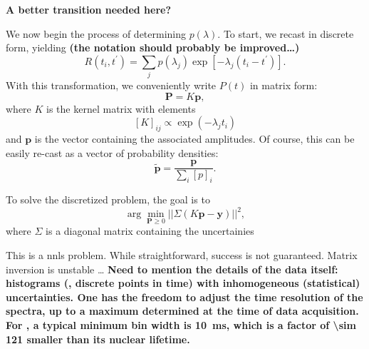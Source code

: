 \textbf{A better transition needed here?}


We now begin the process of determining $p ( \lambda )$.
To start, we recast  in discrete form, yielding
\textbf{(the notation should probably be improved\dots)}
\begin{equation} \label{eq:slr-sum}
   R \left (t_{i}, t^{\prime} \right ) = \sum_{j} p ( \lambda_{j} ) \exp \left [- \lambda_{j} \left ( t_{i} - t^{\prime} \right ) \right ] .
\end{equation}
With this transformation, we conveniently write $P(t)$ in matrix form:
\begin{equation} \label{eq:signal-matrix}
   \mathbf{P} = K \mathbf{p},
\end{equation}
where $K$ is the kernel matrix with elements
\begin{equation}
   \label{eq:kernel}
   [K]_{ij} \propto \exp \left ( - \lambda_{j} t_{i} \right )
\end{equation}
and $\mathbf{p}$ is the vector containing the associated amplitudes.
Of course, this can be easily re-cast as a vector of probability densities:
\begin{equation}
   \tilde{\mathbf{p}} = \frac{ \mathbf{p} }{ \sum_{i} [p]_{i} } .
\end{equation}



To solve the discretized problem, the goal is to
\begin{equation}
   \label{eq:onnls}
   \arg \min_{\mathbf{P} \geq 0} || \Sigma \left ( K \mathbf{p} - \mathbf{y} \right ) ||^{2} ,
\end{equation}
where $\Sigma$ is a diagonal matrix containing the uncertainies

This is a \gls{nnls} problem.
While straightforward, success is not guaranteed.
Matrix inversion is unstable \dots
\textbf{
Need to mention the details of the data itself:
histograms (, discrete points in time) with inhomogeneous (statistical) uncertainties.
One has the freedom to adjust the time resolution of the spectra, up to a maximum determined at the time of data acquisition.
For , a typical minimum bin width is \SI{10}{\milli\second}, which is a factor of \num{\sim 121} smaller than its nuclear lifetime.
}



